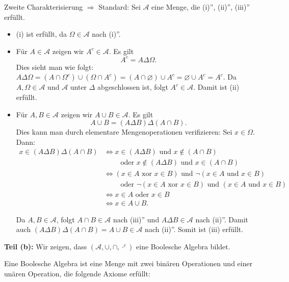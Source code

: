 \documentclass{article}
\newcommand{\Om}{\Omega}
\renewcommand{\AA}{\mathcal{A}}
\theoremstyle{definition}
\begin{document}
Zweite Charakterisierung $\Rightarrow$ Standard: Sei $\AA$ eine Menge, die (i)'', (ii)'', (iii)'' erfüllt.
\begin{itemize}
    \item (i) ist erfüllt, da $\Om \in \AA$ nach (i)''.
    \item Für $A \in \AA$ zeigen wir $A^c \in \AA$. Es gilt
    \[
    A^c = A \Delta \Om.
    \]
    Dies sieht man wie folgt: $A \Delta \Om = (A \cap \Om^c) \cup (\Om \cap A^c) = (A \cap \varnothing) \cup A^c = \varnothing \cup A^c = A^c$.
    Da $A, \Om \in \AA$ und $\AA$ unter $\Delta$ abgeschlossen ist, folgt $A^c \in \AA$. Damit ist (ii) erfüllt.
    \item Für $A, B \in \AA$ zeigen wir $A \cup B \in \AA$. Es gilt
    \[
    A \cup B = (A \Delta B) \Delta (A \cap B).
    \]
    Dies kann man durch elementare Mengenoperationen verifizieren: Sei $x \in \Om$. Dann:
    \begin{align}
    x \in (A \Delta B) \Delta (A \cap B) &\Leftrightarrow x \in (A \Delta B) \text{ und } x \notin (A \cap B)\\
    &\qquad\text{ oder } x \notin (A \Delta B) \text{ und } x \in (A \cap B)\\
    &\Leftrightarrow (x \in A \text{ xor } x \in B) \text{ und } \neg(x \in A \text{ und } x \in B)\\
    &\qquad\text{ oder } \neg(x \in A \text{ xor } x \in B) \text{ und } (x \in A \text{ und } x \in B)\\
    &\Leftrightarrow x \in A \text{ oder } x \in B\\
    &\Leftrightarrow x \in A \cup B.
    \end{align}
    
    Da $A, B \in \AA$, folgt $A \cap B \in \AA$ nach (iii)'' und $A \Delta B \in \AA$ nach (ii)''. Damit auch $(A \Delta B) \Delta (A \cap B) = A \cup B \in \AA$ nach (ii)''. Somit ist (iii) erfüllt.
\end{itemize}

\textbf{Teil (b):} Wir zeigen, dass $(\AA, \cup, \cap, \cdot^c)$ eine Boolesche Algebra bildet.

Eine Boolesche Algebra ist eine Menge mit zwei binären Operationen und einer unären Operation, die folgende Axiome erfüllt:
\end{document}
